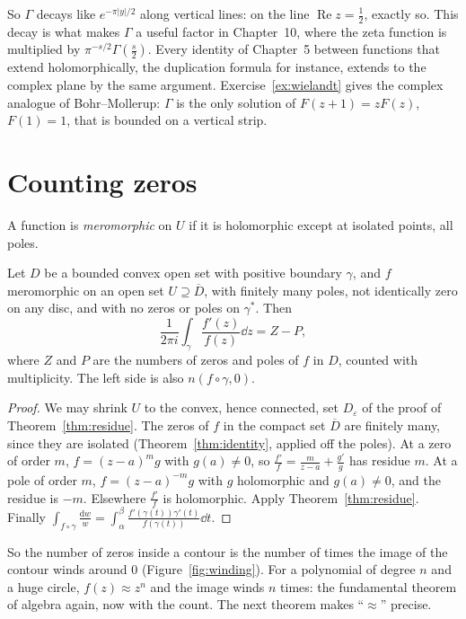 So $\Gamma$ decays like $e^{-\pi|y|/2}$ along vertical lines: on the line $\operatorname{Re}z=\frac12$, exactly so. This decay is what makes
$\Gamma$ a useful factor in Chapter~10, where the zeta function is multiplied by $\pi^{-s/2}\Gamma(\frac s2)$. Every identity of Chapter~5 between functions
that extend holomorphically, the duplication formula for instance, extends to the complex plane by the same argument.
Exercise~\ref{ex:wielandt} gives the complex analogue of Bohr--Mollerup: $\Gamma$ is the only solution of $F(z+1)=zF(z)$, $F(1)=1$, that is
bounded on a vertical strip.

\section{Counting zeros}\label{sec:argument}

A function is \emph{meromorphic} on $U$ if it is holomorphic except at isolated points, all poles.

\begin{theorem}\label{thm:argument}
Let $D$ be a bounded convex open set with positive boundary $\gamma$, and $f$ meromorphic on an open set $U\supseteq\overline D$, with finitely many poles,
not identically zero on any disc, and with no zeros or poles on $\gamma^*$. Then
\[
\frac1{2\pi i}\int_\gamma\frac{f'(z)}{f(z)}\dd z=Z-P,
\]
where $Z$ and $P$ are the numbers of zeros and poles of $f$ in $D$, counted with multiplicity. The left side is also $n(f\circ\gamma,0)$.
\end{theorem}
\begin{proof}
We may shrink $U$ to the convex, hence connected, set $D_\varepsilon$ of the proof of Theorem~\ref{thm:residue}. The zeros of $f$ in the compact set $\overline D$ are
finitely many, since they are isolated (Theorem~\ref{thm:identity}, applied off the poles). At a zero of order $m$, $f=(z-a)^mg$ with $g(a)\ne0$, so
$\frac{f'}f=\frac m{z-a}+\frac{g'}g$ has residue $m$. At a pole of order $m$, $f=(z-a)^{-m}g$ with $g$ holomorphic and $g(a)\ne0$, and the residue is $-m$.
Elsewhere $\frac{f'}f$ is holomorphic. Apply Theorem~\ref{thm:residue}. Finally $\int_{f\circ\gamma}\frac{\mathrm dw}w=\int_\alpha^\beta\frac{f'(\gamma(t))\gamma'(t)}{f(\gamma(t))}\dd t$.
\end{proof}

So the number of zeros inside a contour is the number of times the image of the contour winds around $0$ (Figure~\ref{fig:winding}).
For a polynomial of degree $n$ and a huge circle, $f(z)\approx z^n$ and the image winds $n$ times: the fundamental theorem of
algebra again, now with the count. The next theorem makes ``$\approx$'' precise.

